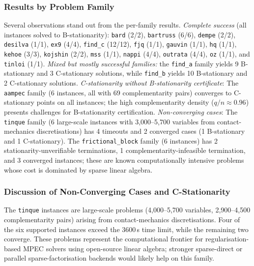 \subsubsection{Results by Problem Family}
\label{sec:mpeclib_family}

Several observations stand out from the per-family results.
\emph{Complete success} (all instances solved to
B-stationarity): \texttt{bard} (2/2), \texttt{bartruss} (6/6),
\texttt{dempe} (2/2), \texttt{desilva} (1/1), \texttt{ex9} (4/4), \texttt{find\_c} (12/12),
\texttt{fjq} (1/1), \texttt{gauvin} (1/1), \texttt{hq} (1/1),
\texttt{kehoe} (3/3), \texttt{kojshin} (2/2), \texttt{mss} (1/1),
\texttt{nappi} (4/4), \texttt{outrata} (4/4), \texttt{oz} (1/1),
and \texttt{tinloi} (1/1).
\emph{Mixed but mostly successful families:} the \texttt{find\_a}
family yields 9 B-stationary and 3 C-stationary solutions, while
\texttt{find\_b} yields 10 B-stationary and 2 C-stationary
solutions.
\emph{C-stationarity without B-stationarity certificate}:
The \texttt{aampec} family (6 instances, all with 69 complementarity pairs)
converges to C-stationary points on all instances; the high complementarity
density ($q/n \approx 0.96$) presents challenges for B-stationarity certification.
\emph{Non-converging cases}: The \texttt{tinque} family (6 large-scale
instances with 3,000--5,700 variables from contact-mechanics discretisations)
has
4 timeouts and 2 converged cases (1 B-stationary and 1 C-stationary).
The \texttt{frictional\_block} family (6 instances) has
2 stationarity-unverifiable terminations, 1 complementarity-infeasible
termination, and 3 converged instances; these are known
computationally intensive problems whose cost is dominated by sparse
linear algebra.


\subsubsection{Discussion of Non-Converging Cases and C-Stationarity}
\label{sec:discussion_large}

The \texttt{tinque} instances are large-scale problems (4,000--5,700
variables, 2,900--4,500 complementarity pairs) arising from
contact-mechanics discretisations. Four of the six supported instances
exceed the 3600\,s time limit, while the remaining two converge.
These problems represent the computational frontier for regularisation-based
MPEC solvers using open-source linear algebra; stronger sparse-direct or
parallel sparse-factorisation backends would likely help on this family.

